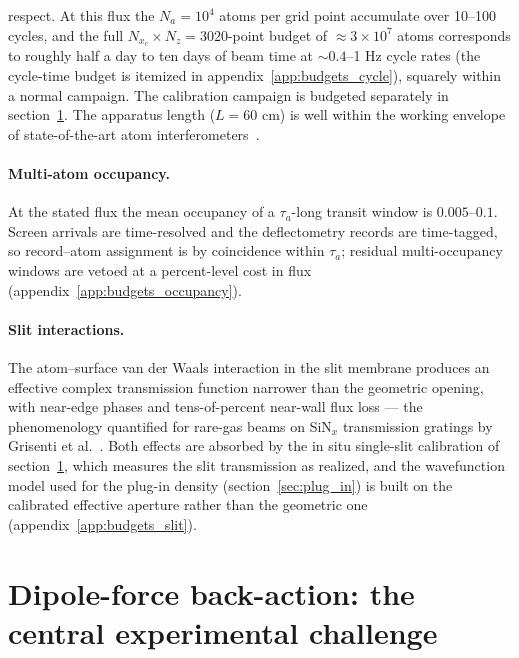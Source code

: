 \documentclass[11pt,a4paper]{article}
\begin{document}
respect. At this flux the $N_a = 10^4$ atoms per grid point accumulate over 10--100 cycles, and the full $N_{x_c}\times N_z = 3020$-point budget of $\approx 3\times 10^7$ atoms corresponds to roughly half a day to ten days of beam time at $\sim 0.4$--1 Hz cycle rates (the cycle-time budget is itemized in appendix~\ref{app:budgets_cycle}), squarely within a normal campaign. The calibration campaign is budgeted separately in section~\ref{sec:dipole_lensing}. The apparatus length ($L = 60$ cm) is well within the working envelope of state-of-the-art atom interferometers~\cite{Cronin2009}.

\paragraph{Multi-atom occupancy.} At the stated flux the mean occupancy of a $\tau_a$-long transit window is $0.005$--$0.1$. Screen arrivals are time-resolved and the deflectometry records are time-tagged, so record--atom assignment is by coincidence within $\tau_a$; residual multi-occupancy windows are vetoed at a percent-level cost in flux (appendix~\ref{app:budgets_occupancy}).

\paragraph{Slit interactions.} The atom--surface van der Waals interaction in the slit membrane produces an effective complex transmission function narrower than the geometric opening, with near-edge phases and tens-of-percent near-wall flux loss --- the phenomenology quantified for rare-gas beams on SiN$_x$ transmission gratings by Grisenti et al.~\cite{Grisenti1999}. Both effects are absorbed by the in situ single-slit calibration of section~\ref{sec:dipole_lensing}, which measures the slit transmission as realized, and the wavefunction model used for the plug-in density (section~\ref{sec:plug_in}) is built on the calibrated effective aperture rather than the geometric one (appendix~\ref{app:budgets_slit}).

\section{Dipole-force back-action: the central experimental challenge}
\label{sec:dipole_lensing}
\end{document}
